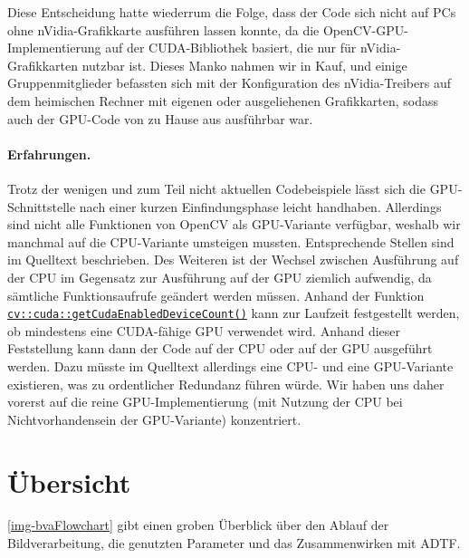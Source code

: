 \documentclass[a4paper,12pt]{report}
\begin{document}
	Diese Entscheidung hatte wiederrum die Folge, dass der Code sich nicht auf PCs ohne nVidia-Grafikkarte ausführen lassen konnte, da die OpenCV-GPU-Implementierung auf der CUDA-Bibliothek basiert, die nur für nVidia-Grafikkarten nutzbar ist.
	Dieses Manko nahmen wir in Kauf, und einige Gruppenmitglieder befassten sich mit der Konfiguration des nVidia-Treibers auf dem heimischen Rechner mit eigenen oder ausgeliehenen Grafikkarten, sodass auch der GPU-Code von zu Hause aus ausführbar war.

	\paragraph{Erfahrungen.}
	Trotz der wenigen und zum Teil nicht aktuellen Codebeispiele lässt sich die GPU-Schnittstelle nach einer kurzen Einfindungsphase leicht handhaben.
	Allerdings sind nicht alle Funktionen von OpenCV als GPU-Variante verfügbar, weshalb wir manchmal auf die CPU-Variante umsteigen mussten. Entsprechende Stellen sind im Quelltext beschrieben. Des Weiteren ist der Wechsel zwischen Ausführung auf der CPU im Gegensatz zur Ausführung auf der GPU ziemlich aufwendig, da sämtliche Funktionsaufrufe geändert werden müssen.
	Anhand der Funktion \href{https://docs.opencv.org/3.4.0/d8/d40/group\_\_cudacore\_\_init.html\#gaaa93892f9189163e5d53790b4b1e88db}{\texttt{cv::cuda::getCudaEnabled\-DeviceCount()}} \cite{opencv-doc} kann zur Laufzeit festgestellt werden, ob mindestens eine CUDA-fähige GPU verwendet wird.
	Anhand dieser Feststellung kann dann der Code auf der CPU oder auf der GPU ausgeführt werden.
	Dazu müsste im Quelltext allerdings eine CPU- und eine GPU-Variante existieren, was zu ordentlicher Redundanz führen würde.
	Wir haben uns daher vorerst auf die reine GPU-Implementierung (mit Nutzung der CPU bei Nichtvorhandensein der GPU-Variante) konzentriert.

\pagebreak

\section{Übersicht}
	\autoref{img-bvaFlowchart} gibt einen groben Überblick über den Ablauf der Bildverarbeitung, die genutzten Parameter und das Zusammenwirken mit ADTF.
\end{document}
